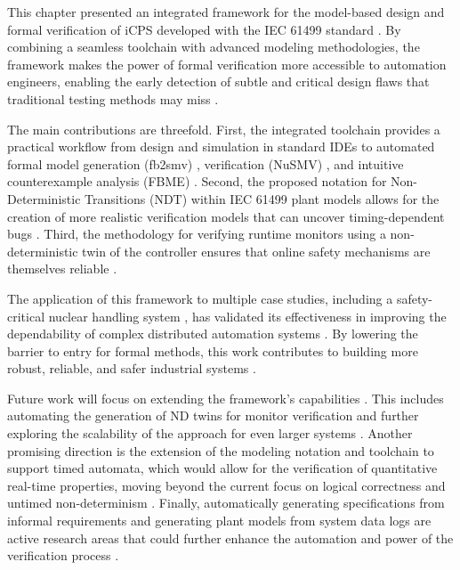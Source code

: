 This chapter presented an integrated framework for the model-based design and formal verification of iCPS developed with the IEC 61499 standard . By combining a seamless toolchain with advanced modeling methodologies, the framework makes the power of formal verification more accessible to automation engineers, enabling the early detection of subtle and critical design flaws that traditional testing methods may miss .

The main contributions are threefold. First, the integrated toolchain provides a practical workflow from design and simulation in standard IDEs to automated formal model generation (fb2smv) , verification (NuSMV) , and intuitive counterexample analysis (FBME) . Second, the proposed notation for Non-Deterministic Transitions (NDT) within IEC 61499 plant models allows for the creation of more realistic verification models that can uncover timing-dependent bugs . Third, the methodology for verifying runtime monitors using a non-deterministic twin of the controller ensures that online safety mechanisms are themselves reliable .

The application of this framework to multiple case studies, including a safety-critical nuclear handling system , has validated its effectiveness in improving the dependability of complex distributed automation systems . By lowering the barrier to entry for formal methods, this work contributes to building more robust, reliable, and safer industrial systems .

Future work will focus on extending the framework's capabilities . This includes automating the generation of ND twins for monitor verification and further exploring the scalability of the approach for even larger systems . Another promising direction is the extension of the modeling notation and toolchain to support timed automata, which would allow for the verification of quantitative real-time properties, moving beyond the current focus on logical correctness and untimed non-determinism . Finally, automatically generating specifications from informal requirements and generating plant models from system data logs are active research areas that could further enhance the automation and power of the verification process .

